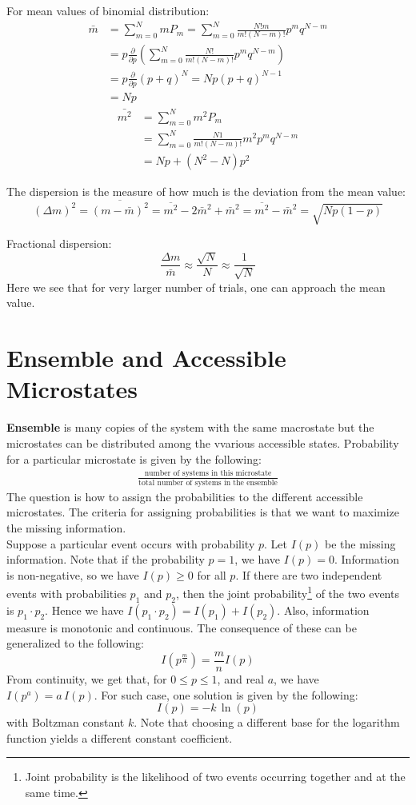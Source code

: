 \documentclass[11pt]{article}
\theoremstyle{break}
\theoremstyle{break}
\begin{document}
For mean values of binomial distribution:
\begin{align*}
\bar m &= \sum_{m=0}^N mP_m = \sum_{m=0}^N \frac{N! m}{m!(N-m)!}p^mq^{N-m} \\
&= p\frac{\partial }{\partial p} \left(\sum_{m=0}^N \frac{N!}{m!(N-m)!}p^m q^{N-m} \right)\\ 
&= p\frac{\partial}{\partial p}(p+q)^N = Np(p+q)^{N-1}\\
&= Np
\end{align*}
\begin{align*}
\bar{m^2} &= \sum_{m=0}^N m^2 P_m \\
&= \sum_{m=0}^N \frac{N1}{m!(N-m)!}m^2p^mq^{N-m}\\
&= Np+(N^2-N)p^2
\end{align*}

The dispersion is the measure of how much is the deviation from the mean value:
$$(\Delta m)^2 = \overline{(m-\bar{m})^2} = \overline{m^2} - 2\bar{m}^2 + \bar{m}^2 = \overline{m^2} - \bar{m}^2 = \sqrt{Np(1-p)}$$

Fractional dispersion:
$$\frac{\Delta m}{\bar{m}} \approx \frac{\sqrt{N}}{N} \approx \frac{1}{\sqrt{N}} $$
Here we see that for very larger number of trials, one can approach the mean value. 

\newpage
\section{\color{red}Ensemble and Accessible Microstates}
\textbf{Ensemble} is many copies of the system with the same macrostate but the microstates can be distributed among the vvarious accessible states. Probability for a particular microstate is given by the following:
\begin{align*}
\frac{\text{number of systems in this microstate}}{\text{total number of systems in the ensemble}}
\end{align*}
The question is how to assign the probabilities to the different accessible microstates. The criteria for assigning probabilities is that we want to maximize the missing information.\\

Suppose a particular event occurs with probability $p$. Let $I(p)$ be the missing information. Note that if the probability $p = 1$, we have $I(p) = 0$. Information is non-negative, so we have $I(p) \geq 0$ for all $p$. If there are two independent events with probabilities $p_1$ and $p_2$, then the joint probability\footnote{Joint probability is the likelihood of two events occurring together and at the same time.} of the two events is $p_1 \cdot p_2$. Hence we have $I(p_1\cdot p_2) = I(p_1) + I(p_2)$. Also, information measure is monotonic and continuous. The consequence of these can be generalized to the following:
$$I(p^{\frac{m}{n}}) = \frac{m}{n}I(p)$$
From continuity, we get that, for $0\leq p \leq 1$, and real $a$, we have $I(p^a) = a \, I (p)$. 
For such case, one solution is given by the following:
$$I(p) = -k\, \ln (p)$$
with Boltzman constant $k$. Note that choosing a different base for the logarithm function yields a different constant coefficient. \\
\end{document}
